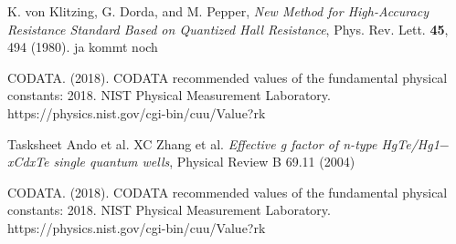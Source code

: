 \begin{thebibliography}{99}
     K. von Klitzing, G. Dorda, and M. Pepper, \emph{New Method for High-Accuracy
    Resistance Standard Based on Quantized Hall Resistance}, Phys. Rev. Lett. \textbf{45}, 494 (1980).
     ja kommt noch

    CODATA. (2018). CODATA recommended values of the fundamental physical constants: 
    2018. NIST Physical Measurement Laboratory.
    https://physics.nist.gov/cgi-bin/cuu/Value?rk



     Tasksheet
     Ando et al.
     XC Zhang et al. \emph{Effective g factor of n-type HgTe/Hg1$−$xCdxTe single quantum wells}, 
                    Physical Review B 69.11 (2004)

    CODATA. (2018). CODATA recommended values of the fundamental physical constants: 
    2018. NIST Physical Measurement Laboratory.
    https://physics.nist.gov/cgi-bin/cuu/Value?rk



\end{thebibliography}



